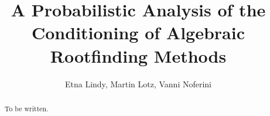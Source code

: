 \documentclass[12pt]{article}
\title{A Probabilistic Analysis of the Conditioning of Algebraic Rootfinding Methods}
\author{Etna Lindy, Martin Lotz, Vanni Noferini}
\begin{document}
\maketitle

\begin{abstract}
  To be written.
\end{abstract}

















\end{document}
